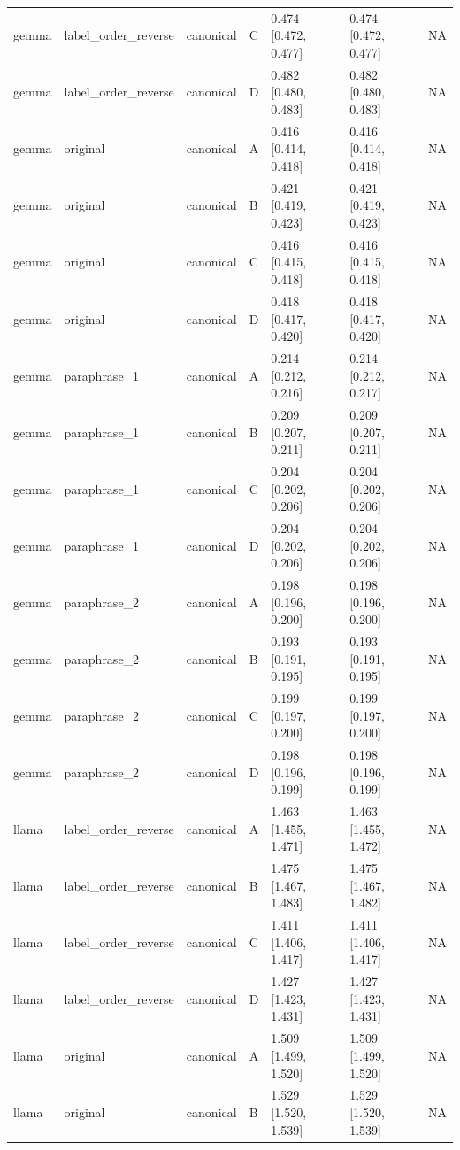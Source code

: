 \begin{tabular}{lllllll}
gemma & label\_order\_reverse & canonical & C & 0.474 [0.472, 0.477] & 0.474 [0.472, 0.477] & NA \\
gemma & label\_order\_reverse & canonical & D & 0.482 [0.480, 0.483] & 0.482 [0.480, 0.483] & NA \\
gemma & original & canonical & A & 0.416 [0.414, 0.418] & 0.416 [0.414, 0.418] & NA \\
gemma & original & canonical & B & 0.421 [0.419, 0.423] & 0.421 [0.419, 0.423] & NA \\
gemma & original & canonical & C & 0.416 [0.415, 0.418] & 0.416 [0.415, 0.418] & NA \\
gemma & original & canonical & D & 0.418 [0.417, 0.420] & 0.418 [0.417, 0.420] & NA \\
gemma & paraphrase\_1 & canonical & A & 0.214 [0.212, 0.216] & 0.214 [0.212, 0.217] & NA \\
gemma & paraphrase\_1 & canonical & B & 0.209 [0.207, 0.211] & 0.209 [0.207, 0.211] & NA \\
gemma & paraphrase\_1 & canonical & C & 0.204 [0.202, 0.206] & 0.204 [0.202, 0.206] & NA \\
gemma & paraphrase\_1 & canonical & D & 0.204 [0.202, 0.206] & 0.204 [0.202, 0.206] & NA \\
gemma & paraphrase\_2 & canonical & A & 0.198 [0.196, 0.200] & 0.198 [0.196, 0.200] & NA \\
gemma & paraphrase\_2 & canonical & B & 0.193 [0.191, 0.195] & 0.193 [0.191, 0.195] & NA \\
gemma & paraphrase\_2 & canonical & C & 0.199 [0.197, 0.200] & 0.199 [0.197, 0.200] & NA \\
gemma & paraphrase\_2 & canonical & D & 0.198 [0.196, 0.199] & 0.198 [0.196, 0.199] & NA \\
llama & label\_order\_reverse & canonical & A & 1.463 [1.455, 1.471] & 1.463 [1.455, 1.472] & NA \\
llama & label\_order\_reverse & canonical & B & 1.475 [1.467, 1.483] & 1.475 [1.467, 1.482] & NA \\
llama & label\_order\_reverse & canonical & C & 1.411 [1.406, 1.417] & 1.411 [1.406, 1.417] & NA \\
llama & label\_order\_reverse & canonical & D & 1.427 [1.423, 1.431] & 1.427 [1.423, 1.431] & NA \\
llama & original & canonical & A & 1.509 [1.499, 1.520] & 1.509 [1.499, 1.520] & NA \\
llama & original & canonical & B & 1.529 [1.520, 1.539] & 1.529 [1.520, 1.539] & NA \\

\end{tabular}
